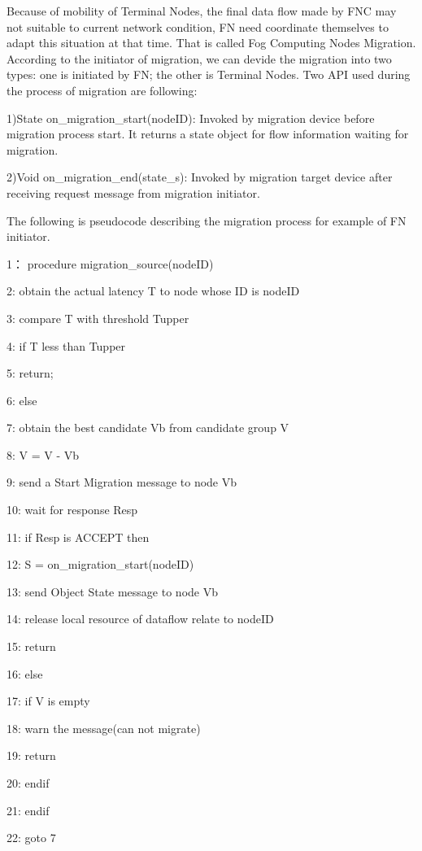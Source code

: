 \documentclass[conference]{IEEEtran}
\begin{document}
Because of mobility of Terminal Nodes, the final data flow made by FNC may not suitable to current network condition, FN need coordinate themselves to adapt this situation at that time. That is called Fog Computing Nodes Migration. According to the initiator of migration, we can devide the migration into two types: one is initiated by FN; the other is Terminal Nodes. Two API used during the process of migration are following: 

1)State on\_migration\_start(nodeID): Invoked by migration device before migration process start. It returns a state object for flow information waiting for migration.

2)Void on\_migration\_end(state\_s): Invoked by migration target device after receiving request message from migration initiator.

The following is pseudocode describing the migration process for example of FN initiator.

1：  procedure migration\_source(nodeID)

2:   	obtain the actual latency T to node whose ID is nodeID

3:   	compare T with threshold Tupper

4:   	if  T  less than  Tupper

5:      	return;

6:   	else 

7:      	obtain the best candidate Vb from candidate group V

8:      	V = V - Vb

9:      	send a Start Migration message to node Vb

10:     	wait for response Resp

11:     if  Resp is ACCEPT then

12:        S = on\_migration\_start(nodeID)

13:        send Object State message to node Vb

14:        release local resource of dataflow relate to nodeID

15:        return

16:     else 

17:        if V is empty

18:          warn the message(can not migrate)

19:          return

20:        endif

21:     endif

22:     goto 7
\end{document}

